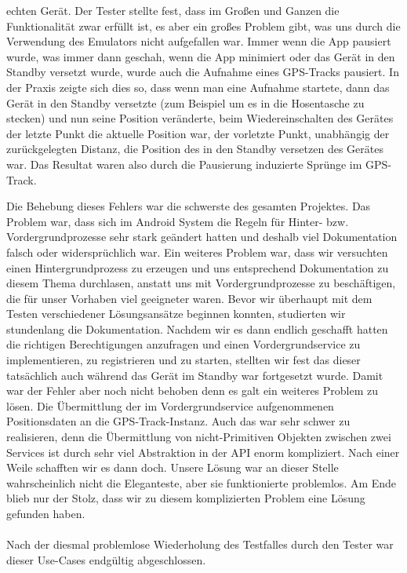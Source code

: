 \documentclass[10pt]{article}
\begin{document}
echten Gerät. Der Tester stellte fest, dass im Großen und Ganzen die Funktionalität zwar erfüllt ist, es aber ein 
großes Problem gibt, was uns durch die Verwendung des Emulators nicht aufgefallen war. 
Immer wenn die App pausiert wurde, was immer dann geschah, wenn die App minimiert oder das Gerät in den Standby 
versetzt wurde, wurde auch die Aufnahme eines GPS-Tracks pausiert. In der Praxis zeigte sich dies so, dass wenn man 
eine Aufnahme startete, dann das Gerät in den Standby versetzte (zum Beispiel um es in die Hosentasche zu stecken) 
und nun seine Position veränderte, beim Wiedereinschalten des Gerätes der letzte Punkt die aktuelle Position war, der 
vorletzte Punkt, unabhängig der zurückgelegten Distanz, die Position des in den Standby versetzen des Gerätes war.
Das Resultat waren also durch die Pausierung induzierte Sprünge im GPS-Track.\par 
\medskip
Die Behebung dieses Fehlers war die schwerste des gesamten Projektes. Das Problem war, dass sich im Android System
die Regeln für Hinter- bzw. Vordergrundprozesse sehr stark geändert hatten und deshalb viel Dokumentation 
falsch oder widersprüchlich war. Ein weiteres Problem war, dass wir versuchten einen Hintergrundprozess zu erzeugen und 
uns entsprechend Dokumentation zu diesem Thema durchlasen, anstatt uns mit Vordergrundprozesse zu beschäftigen, die 
für unser Vorhaben viel geeigneter waren. Bevor wir überhaupt mit dem Testen verschiedener Lösungsansätze beginnen konnten,
studierten wir stundenlang die Dokumentation. Nachdem wir es dann endlich geschafft hatten die richtigen Berechtigungen
anzufragen und einen Vordergrundservice 
zu implementieren, zu registrieren und zu starten, stellten wir fest das dieser tatsächlich auch während das Gerät
im Standby war fortgesetzt wurde. Damit war der Fehler aber noch nicht behoben denn es galt ein weiteres Problem zu lösen.
Die Übermittlung der im Vordergrundservice aufgenommenen Positionsdaten an die GPS-Track-Instanz. Auch das war
sehr schwer zu realisieren, denn die Übermittlung von nicht-Primitiven Objekten zwischen zwei Services ist durch sehr 
viel Abstraktion in der API enorm kompliziert. Nach einer Weile schafften wir es dann doch. Unsere Lösung war an 
dieser Stelle wahrscheinlich nicht die Eleganteste, aber sie funktionierte problemlos. Am Ende blieb nur der Stolz, 
dass wir zu diesem komplizierten Problem eine Lösung gefunden haben.\\
\\
Nach der diesmal problemlose Wiederholung des Testfalles durch den Tester war dieser Use-Cases endgültig abgeschlossen.
\end{document}
